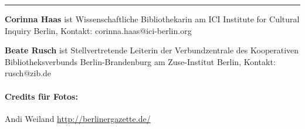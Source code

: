 \begin{center}\rule{3in}{0.4pt}\end{center}

\textbf{Corinna Haas} ist Wissenschaftliche Bibliothekarin am ICI
Institute for Cultural Inquiry Berlin, Kontakt:
corinna.haas@ici-berlin.org

\textbf{Beate Rusch} ist Stellvertretende Leiterin der Verbundzentrale
des Kooperativen Bibliotheksverbunds Berlin-Brandenburg am Zuse-Institut
Berlin, Kontakt: rusch@zib.de

\paragraph{Credits für Fotos:}\label{credits-fuxfcr-fotos}

Andi Weiland \textbar{} \url{http://berlinergazette.de/}
